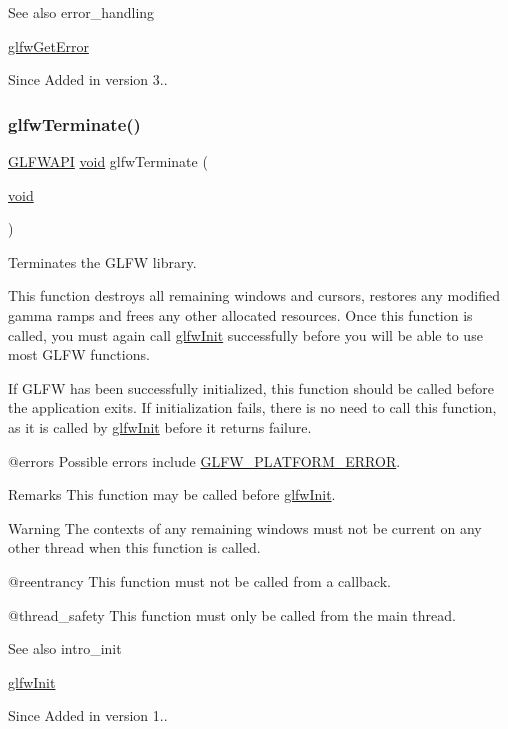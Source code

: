 \begin{DoxySeeAlso}{See also}
error\+\_\+handling 

\mbox{\hyperlink{group__init_gaee7bac4c7e1b2769207747c1b5ae2f9e}{glfw\+Get\+Error}}
\end{DoxySeeAlso}
\begin{DoxySince}{Since}
Added in version 3.. 
\end{DoxySince}
\mbox{\label{group__init_gafd90e6fd4819ea9e22e5e739519a6504}} 
\subsubsection{\texorpdfstring{glfwTerminate()}{glfwTerminate()}}
{\footnotesize\ttfamily \mbox{\hyperlink{glfw3_8h_a56da5036b2cc259351ae22fd6439bb47}{G\+L\+F\+W\+A\+PI}} \mbox{\hyperlink{glad_8h_a950fc91edb4504f62f1c577bf4727c29}{void}} glfw\+Terminate (\begin{DoxyParamCaption}\item[{\mbox{\hyperlink{glad_8h_a950fc91edb4504f62f1c577bf4727c29}{void}}}]{ }\end{DoxyParamCaption})}



Terminates the G\+L\+FW library. 

This function destroys all remaining windows and cursors, restores any modified gamma ramps and frees any other allocated resources. Once this function is called, you must again call \mbox{\hyperlink{group__init_gab41771f0215a2e0afb4cf1cf98082d40}{glfw\+Init}} successfully before you will be able to use most G\+L\+FW functions.

If G\+L\+FW has been successfully initialized, this function should be called before the application exits. If initialization fails, there is no need to call this function, as it is called by \mbox{\hyperlink{group__init_gab41771f0215a2e0afb4cf1cf98082d40}{glfw\+Init}} before it returns failure.

@errors Possible errors include \mbox{\hyperlink{group__errors_gad44162d78100ea5e87cdd38426b8c7a1}{G\+L\+F\+W\+\_\+\+P\+L\+A\+T\+F\+O\+R\+M\+\_\+\+E\+R\+R\+OR}}.

\begin{DoxyRemark}{Remarks}
This function may be called before \mbox{\hyperlink{group__init_gab41771f0215a2e0afb4cf1cf98082d40}{glfw\+Init}}.
\end{DoxyRemark}
\begin{DoxyWarning}{Warning}
The contexts of any remaining windows must not be current on any other thread when this function is called.
\end{DoxyWarning}
@reentrancy This function must not be called from a callback.

@thread\+\_\+safety This function must only be called from the main thread.

\begin{DoxySeeAlso}{See also}
intro\+\_\+init 

\mbox{\hyperlink{group__init_gab41771f0215a2e0afb4cf1cf98082d40}{glfw\+Init}}
\end{DoxySeeAlso}
\begin{DoxySince}{Since}
Added in version 1.. 
\end{DoxySince}
